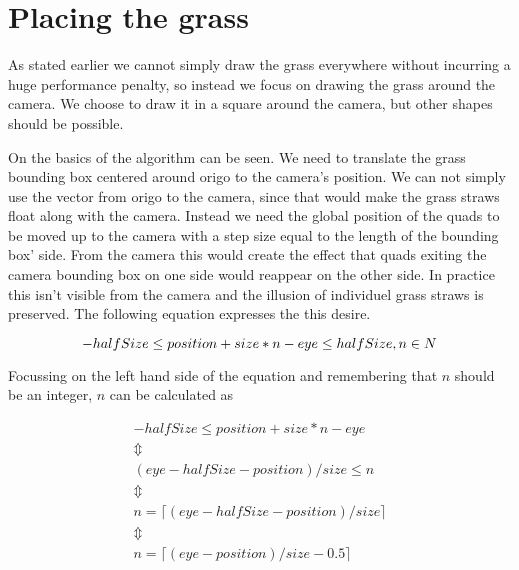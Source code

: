 \section{Placing the grass}

As stated earlier we cannot simply draw the grass everywhere without
incurring a huge performance penalty, so instead we focus on drawing
the grass around the camera. We choose to draw it in a square around
the camera, but other shapes should be possible.


On  the basics of the algorithm can be
seen. We need to translate the grass bounding box centered around
origo to the camera's position. We can not simply use the vector from
origo to the camera, since that would make the grass straws float
along with the camera. Instead we need the global position of the
quads to be moved up to the camera with a step size equal to the
length of the bounding box' side. From the camera this would create
the effect that quads exiting the camera bounding box on one side
would reappear on the other side. In practice this isn't visible from
the camera and the illusion of individuel grass straws is
preserved. The following equation expresses the this desire.

\begin{displaymath}
    -halfSize \le position + size * n - eye \le halfSize, n \in N \\
\end{displaymath}

Focussing on the left hand side of the equation and remembering that
$n$ should be an integer, $n$ can be calculated as

\begin{displaymath}
  \begin{array}{l}
    -halfSize \le position + size * n - eye \\
    \Updownarrow \\
    (eye - halfSize - position) / size \le n \\
    \Updownarrow \\
    n = \lceil (eye - halfSize - position) / size \rceil \\
    \Updownarrow \\
    n = \lceil (eye - position) / size - 0.5 \rceil \\
  \end{array}
\end{displaymath}

